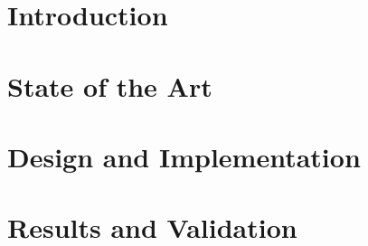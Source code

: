 \documentclass[a4paper,oneside,12pt]{book}
\begin{document}



%
\tableofcontents
\listoffigures
\listoftables
\pagebreak

\chapter{Introduction}
\chapter{State of the Art}


\chapter{Design and Implementation}


\chapter{Results and Validation}


\begin{footnotesize}
\cleardoublepage
{}


\end{footnotesize}
\end{document}
